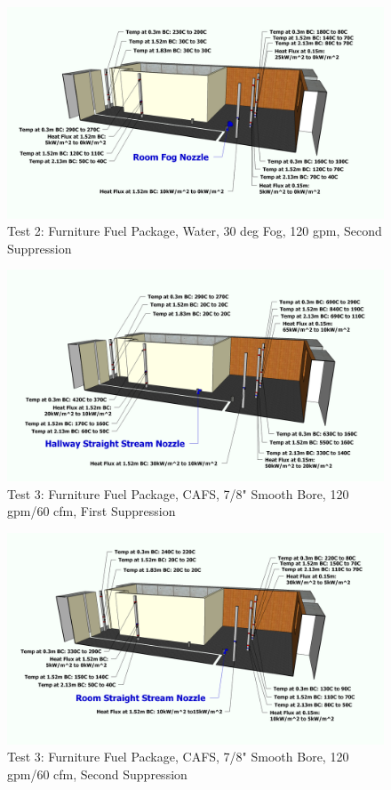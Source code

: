 \documentclass[12pt,oneside]{book}
\begin{document}
\begin{figure}[!ht]
	\includegraphics[width=6in]{../Figures/Pictures/Metric/DelCoFogTest2SecondSuppression}
	\caption{Test 2: Furniture Fuel Package, Water, 30 deg Fog, 120 gpm, Second Suppression}
	\label{fig:Test_2_Second_Suppression}
\end{figure}

\begin{figure}[!ht]
	\includegraphics[width=6in]{../Figures/Pictures/Metric/DelCoSSTest3FirstSuppression}
	\caption{Test 3: Furniture Fuel Package, CAFS, 7/8" Smooth Bore, 120 gpm/60 cfm, First Suppression}
	\label{fig:Test_3_First_Suppression}
\end{figure}

\begin{figure}[!ht]
	\includegraphics[width=6in]{../Figures/Pictures/Metric/DelCoSSTest3SecondSuppression}
	\caption{Test 3: Furniture Fuel Package, CAFS, 7/8" Smooth Bore, 120 gpm/60 cfm, Second Suppression}
	\label{fig:Test_3_Second_Suppression}
\end{figure}
\end{document}
